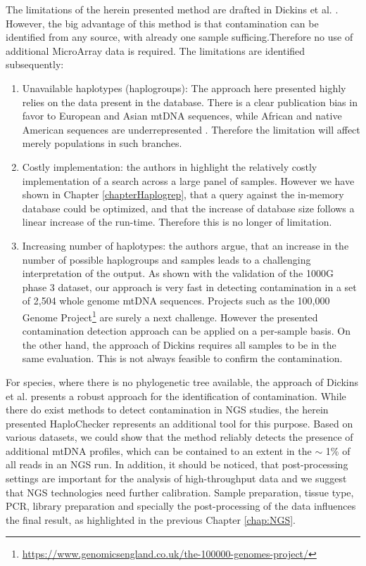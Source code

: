 The limitations of the herein presented method are drafted in Dickins et al. \cite{Dickins2014}. However, the big advantage of this method is that contamination can be identified from any source, with already one sample sufficing.Therefore no use of additional MicroArray data is required. The limitations are identified subsequently:
\begin{enumerate}
\item Unavailable haplotypes (haplogroups): The approach here presented highly relies on the data present in the database. There is a clear publication bias in favor to European and Asian mtDNA sequences, while African and native American sequences are underrepresented \cite{Fendt2011}. Therefore the limitation will affect merely populations in such branches. 
\item Costly implementation: the authors in \cite{Dickins2014} highlight the relatively costly implementation of a search across a large panel of samples. However we have shown in Chapter \ref{chapterHaplogrep}, that a query against the in-memory database could be optimized, and that the increase of database size follows a linear increase of the run-time. Therefore this is no longer of limitation.
\item Increasing number of haplotypes: the authors argue, that an increase in the number of possible haplogroups and samples leads to a challenging interpretation of the output. As shown with the validation of the 1000G phase 3 dataset, our approach is very fast in detecting contamination in a set of 2,504 whole genome mtDNA sequences. Projects such as the 100,000 Genome Project\footnote{\url{https://www.genomicsengland.co.uk/the-100000-genomes-project/}} are surely a next challenge. However the presented  contamination detection approach can be applied on a per-sample basis. On the other hand, the approach of Dickins requires all samples to be in the same evaluation. This is not always feasible to confirm the contamination.
\end{enumerate}
For species, where there is no phylogenetic tree available, the approach of Dickins et al. presents a robust approach for the identification of contamination. While there do exist methods to detect contamination in NGS studies, the herein presented HaploChecker represents an additional tool for this purpose. Based on various datasets, we could show that the method reliably detects the presence of additional mtDNA profiles, which can be contained to an extent in the $\sim$ 1\% of all reads in an NGS run. 
In addition, it should be noticed, that post-processing settings are important for the analysis of high-throughput data and we suggest that NGS technologies need further calibration. Sample preparation, tissue type, PCR, library preparation and specially the post-processing of the data influences the final result, as highlighted in the previous Chapter \ref{chap:NGS}.

